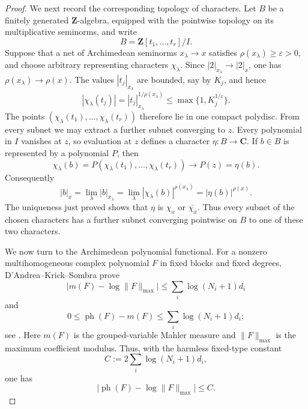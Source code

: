 \begin{proof}
We next record the corresponding topology of characters.  Let \(B\) be a
finitely generated \(\mathbf Z\)-algebra, equipped with the pointwise
topology on its multiplicative seminorms, and write
\[
 B=\mathbf Z[t_1,\ldots,t_r]/I.
\]
Suppose that a net of Archimedean seminorms \(x_\lambda\to x\) satisfies
\(\rho(x_\lambda)\geq\varepsilon>0\), and choose arbitrary representing
characters \(\chi_\lambda\).  Since
\(|2|_{x_\lambda}\to|2|_x\), one has
\(\rho(x_\lambda)\to\rho(x)\).  The values
\(|t_j|_{x_\lambda}\) are bounded, say by \(K_j\), and hence
\[
 |\chi_\lambda(t_j)|
 =|t_j|_{x_\lambda}^{1/\rho(x_\lambda)}
 \leq\max\{1,K_j^{1/\varepsilon}\}.
\]
The points
\((\chi_\lambda(t_1),\ldots,\chi_\lambda(t_r))\) therefore lie in one
compact polydisc.  From every subnet we may extract a further subnet
converging to \(z\).  Every polynomial in \(I\) vanishes at \(z\), so
evaluation at \(z\) defines a character
\(\eta\colon B\to\mathbf C\).  If \(b\in B\) is represented by a polynomial
\(P\), then
\[
 \chi_\lambda(b)=P(\chi_\lambda(t_1),\ldots,
 \chi_\lambda(t_r))\longrightarrow P(z)=\eta(b).
\]
Consequently
\[
 |b|_x=\lim_\lambda|b|_{x_\lambda}
 =\lim_\lambda|\chi_\lambda(b)|^{\rho(x_\lambda)}
 =|\eta(b)|^{\rho(x)}.
\]
The uniqueness just proved shows that \(\eta\) is \(\chi_x\) or
\(\overline{\chi_x}\).  Thus every subnet of the chosen characters has a
further subnet converging pointwise on \(B\) to one of these two
characters.

We now turn to the Archimedean polynomial functional.  For a nonzero
multihomogeneous complex polynomial \(F\) in fixed blocks and fixed degrees,
D'Andrea--Krick--Sombra prove
\[
 \bigl|m(F)-\log\|F\|_{\max}\bigr|
 \leq\sum_i\log(N_i+1)d_i
\]
and
\[
 0\leq\operatorname{ph}(F)-m(F)
 \leq\sum_i\log(N_i+1)d_i;
\]
see \cite[Lemma~2.32, Definition~2.33, and (2.34)--(2.35)]{DKS13Heights}.
Here \(m(F)\) is the grouped-variable Mahler measure and
\(\|F\|_{\max}\) is the maximum coefficient modulus.  Thus, with the
harmless fixed-type constant
\begin{equation}\label{eq:hybrid-philippon-fixed-bound}
 C:=2\sum_i\log(N_i+1)d_i,
\end{equation}
one has
\begin{equation}\label{eq:hybrid-philippon-coefficient-bound}
 \bigl|\operatorname{ph}(F)-\log\|F\|_{\max}\bigr|\leq C.
\end{equation}


\end{proof}
